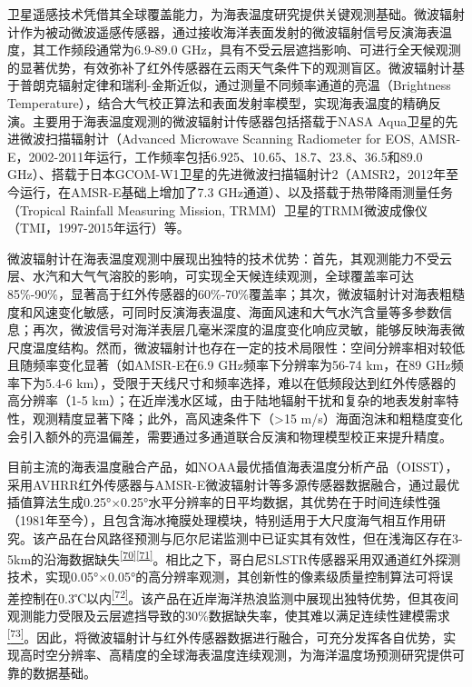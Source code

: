 \documentclass[
  12pt,
]{article}
\begin{document}
卫星遥感技术凭借其全球覆盖能力，为海表温度研究提供关键观测基础。微波辐射计作为被动微波遥感传感器，通过接收海洋表面发射的微波辐射信号反演海表温度，其工作频段通常为6.9-89.0 GHz，具有不受云层遮挡影响、可进行全天候观测的显著优势，有效弥补了红外传感器在云雨天气条件下的观测盲区。微波辐射计基于普朗克辐射定律和瑞利-金斯近似，通过测量不同频率通道的亮温（Brightness Temperature），结合大气校正算法和表面发射率模型，实现海表温度的精确反演。主要用于海表温度观测的微波辐射计传感器包括搭载于NASA Aqua卫星的先进微波扫描辐射计（Advanced Microwave Scanning Radiometer for EOS, AMSR-E，2002-2011年运行，工作频率包括6.925、10.65、18.7、23.8、36.5和89.0 GHz）、搭载于日本GCOM-W1卫星的先进微波扫描辐射计2（AMSR2，2012年至今运行，在AMSR-E基础上增加了7.3 GHz通道）、以及搭载于热带降雨测量任务（Tropical Rainfall Measuring Mission, TRMM）卫星的TRMM微波成像仪（TMI，1997-2015年运行）等。

微波辐射计在海表温度观测中展现出独特的技术优势：首先，其观测能力不受云层、水汽和大气气溶胶的影响，可实现全天候连续观测，全球覆盖率可达85\%-90\%，显著高于红外传感器的60\%-70\%覆盖率；其次，微波辐射计对海表粗糙度和风速变化敏感，可同时反演海表温度、海面风速和大气水汽含量等多参数信息；再次，微波信号对海洋表层几毫米深度的温度变化响应灵敏，能够反映海表微尺度温度结构。然而，微波辐射计也存在一定的技术局限性：空间分辨率相对较低且随频率变化显著（如AMSR-E在6.9 GHz频率下分辨率为56-74 km，在89 GHz频率下为5.4-6 km），受限于天线尺寸和频率选择，难以在低频段达到红外传感器的高分辨率（1-5 km）；在近岸浅水区域，由于陆地辐射干扰和复杂的地表发射率特性，观测精度显著下降；此外，高风速条件下（>15 m/s）海面泡沫和粗糙度变化会引入额外的亮温偏差，需要通过多通道联合反演和物理模型校正来提升精度。

目前主流的海表温度融合产品，如NOAA最优插值海表温度分析产品（OISST），采用AVHRR红外传感器与AMSR-E微波辐射计等多源传感器数据融合，通过最优插值算法生成0.25°×0.25°水平分辨率的日平均数据，其优势在于时间连续性强（1981年至今），且包含海冰掩膜处理模块，特别适用于大尺度海气相互作用研究。该产品在台风路径预测与厄尔尼诺监测中已证实其有效性，但在浅海区存在3-5km的沿海数据缺失\textsuperscript{\hyperref[_Ref165148613]{{[}70{]}}\hyperref[_Ref165148613]{{[}71{]}}}。相比之下，哥白尼SLSTR传感器采用双通道红外探测技术，实现0.05°×0.05°的高分辨率观测，其创新性的像素级质量控制算法可将误差控制在0.3℃以内\hyperref[_Ref165148613]{\textsuperscript{{[}72{]}}}。该产品在近岸海洋热浪监测中展现出独特优势，但其夜间观测能力受限及云层遮挡导致的30\%数据缺失率，使其难以满足连续性建模需求\hyperref[_Ref165148613]{\textsuperscript{{[}73{]}}}。因此，将微波辐射计与红外传感器数据进行融合，可充分发挥各自优势，实现高时空分辨率、高精度的全球海表温度连续观测，为海洋温度场预测研究提供可靠的数据基础。
\end{document}
